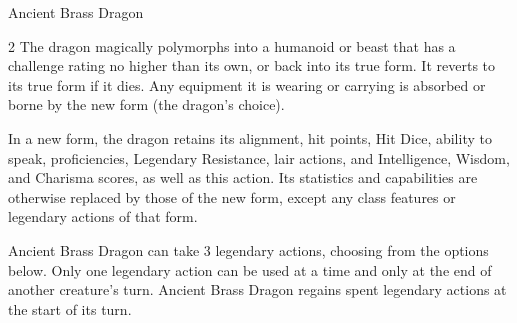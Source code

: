 \documentclass[10pt,a4paper,twoside,bg=print,twocolumn,openany,nodeprecatedcode]{dndbook}
\begin{document}
\begin{DndMonster}[float*=b,width=\textwidth + 8pt]{Ancient Brass Dragon}
\begin{multicols}{2}
The dragon magically polymorphs into a humanoid or beast that has a challenge rating no higher than its own, or back into its true form. It reverts to its true form if it dies. Any equipment it is wearing or carrying is absorbed or borne by the new form (the dragon's choice).

In a new form, the dragon retains its alignment, hit points, Hit Dice, ability to speak, proficiencies, Legendary Resistance, lair actions, and Intelligence, Wisdom, and Charisma scores, as well as this action. Its statistics and capabilities are otherwise replaced by those of the new form, except any class features or legendary actions of that form.

Ancient Brass Dragon can take 3 legendary actions, choosing from the options below. Only one legendary action can be used at a time and only at the end of another creature's turn. Ancient Brass Dragon regains spent legendary actions at the start of its turn.

\begin{DndMonsterLegendaryActions}
\end{DndMonsterLegendaryActions}
\end{multicols}
\end{DndMonster}
\end{document}

